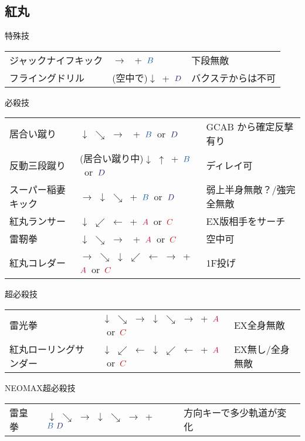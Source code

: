 \documentclass[a4j,11pt]{jarticle}
\def\A{\textcolor{Acolor}{A}}
\def\C{\textcolor{Ccolor}{C}}
\def\B{\textcolor{Bcolor}{B}}
\def\D{\textcolor{Dcolor}{D}}
\begin{document}
\subsection{紅丸}
\begin{itembox}[l]{特殊技}
\begin{tabular}{lll}
ジャックナイフキック&$\rightarrow$ \ +\ $\B$&下段無敵\\
フライングドリル&(空中で)$\downarrow$\ +\ $\D$&バクステからは不可
\end{tabular}
\end{itembox}
\begin{itembox}[l]{必殺技}
\begin{tabular}{lll}
居合い蹴り&$\downarrow$ $\searrow$ $\rightarrow$ \ +\ $\B$\ or\ $\D$&GC\A\B
から確定反撃有り\\
反動三段蹴り&(居合い蹴り中)$\downarrow$ $\uparrow$\ +\ $\B$\ or\ $\D$&ディレイ可\\
スーパー稲妻キック&$\rightarrow$ $\downarrow$ $\searrow$\ +\ $\B$\ or\ $\D$&弱上半身無敵？/強完全無敵\\
紅丸ランサー&$\downarrow$ $\swarrow$ $\leftarrow$\ +\ $\A$\ or\ $\C$&EX版相手をサーチ\\
雷靭拳&$\downarrow$ $\searrow$ $\rightarrow$ \ +\ $\A$\ or\ $\C$&空中可\\
紅丸コレダー&$\rightarrow$ $\searrow$ $\downarrow$ $\swarrow$ $\leftarrow$ $\rightarrow$\ +\ $\A$\ or\ $\C$&1F投げ
\end{tabular}
\end{itembox}
\begin{itembox}[l]{超必殺技}
\begin{tabular}{lll}
雷光拳&$\downarrow$ $\searrow$ $\rightarrow$ $\downarrow$ $\searrow$ $\rightarrow$\ +\ $\A$\ or\ $\C$&EX全身無敵\\
紅丸ローリングサンダー&$\downarrow$ $\swarrow$ $\leftarrow$ $\downarrow$ $\swarrow$ $\leftarrow$\ +\ $\A$\ or\ $\C$&EX無し/全身無敵
\end{tabular}
\end{itembox}
\begin{itembox}[l]{NEOMAX超必殺技}
\begin{tabular}{lll}
雷皇拳&$\downarrow$ $\searrow$ $\rightarrow$ $\downarrow$ $\searrow$ $\rightarrow$\ +\ $\B\ \D$&方向キーで多少軌道が変化
\end{tabular}
\end{itembox}
\newpage
\end{document}
